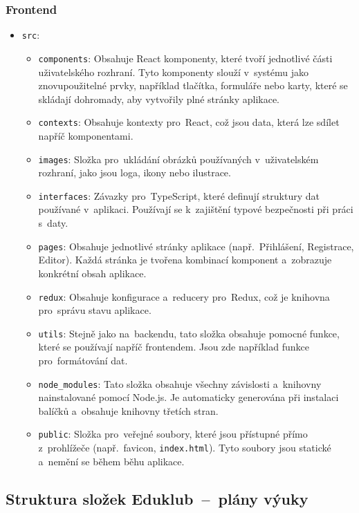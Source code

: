 \documentclass[male,czech,api_bc]{kitheses}
\begin{document}
\subsubsection{Frontend}
\begin{itemize}
	\item \texttt{src}:
	\begin{itemize}
		\item \texttt{components}: Obsahuje React komponenty, které tvoří jednotlivé části uživatelského rozhraní. Tyto komponenty slouží v~systému jako znovupoužitelné prvky, například tlačítka, formuláře nebo karty, které se skládají dohromady, aby vytvořily plné stránky aplikace.
		\item \texttt{contexts}: Obsahuje kontexty pro~React, což jsou data, která lze sdílet napříč komponentami.
		\item \texttt{images}: Složka pro~ukládání obrázků používaných v~uživatelském rozhraní, jako jsou loga, ikony nebo ilustrace.
		\item \texttt{interfaces}: Závazky pro~TypeScript, které definují struktury dat používané v~aplikaci. Používají se k~zajištění typové bezpečnosti při práci s~daty.
		\item \texttt{pages}: Obsahuje jednotlivé stránky aplikace (např.~Přihlášení, Registrace, Editor). Každá stránka je tvořena kombinací komponent a~zobrazuje konkrétní obsah aplikace.
		\item \texttt{redux}: Obsahuje konfigurace a~reducery pro~Redux, což je knihovna pro~správu stavu aplikace.
		\item \texttt{utils}: Stejně jako na~backendu, tato složka obsahuje pomocné funkce, které se používají napříč frontendem. Jsou zde například funkce pro~formátování dat.
		\item \texttt{node\_modules}: Tato složka obsahuje všechny závislosti a~knihovny nainstalované pomocí Node.js. Je automaticky generována při instalaci balíčků a~obsahuje knihovny třetích stran.
		\item \texttt{public}: Složka pro~veřejné soubory, které jsou přístupné přímo z~prohlížeče (např.~favicon, \texttt{index.html}). Tyto soubory jsou statické a~nemění se během běhu aplikace.
	\end{itemize}
\end{itemize}

\subsection{Struktura složek Eduklub~--~plány výuky}
\end{document}
